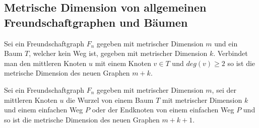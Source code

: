 \subsection{Metrische Dimension von allgemeinen Freundschaftgraphen und Bäumen}
\label{amal}
\begin{lem}
Sei ein Freundschaftgraph $F_n$ gegeben mit metrischer Dimension $m$ und ein Baum $T$, welcher kein Weg ist, gegeben mit metrischer Dimension $k$. Verbindet man den mittleren Knoten $u$ mit einem Knoten $v \in T$ und $deg(v)\geq 2$ so ist die metrische Dimension des neuen Graphen $m+k$.
\end{lem}

\begin{lem}
Sei ein Freundschaftgraph $F_n$ gegeben mit metrischer Dimension $m$, sei der mittleren Knoten $u$ die Wurzel von einem Baum $T$ mit metrischer Dimension $k$ und einem einfachen Weg $P$ oder der Endknoten von einem einfachen Weg $P$ und so ist die metrische Dimension des neuen Graphen $m+k+1$.
\end{lem}

\newpage
\vspace{-2mm}
